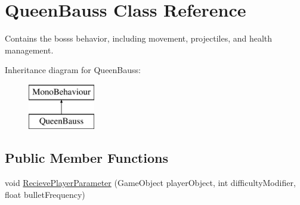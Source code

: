 \hypertarget{class_queen_bauss}{}\section{Queen\+Bauss Class Reference}
\label{class_queen_bauss}


Contains the boss\textquotesingle{}s behavior, including movement, projectiles, and health management.  


Inheritance diagram for Queen\+Bauss\+:\begin{figure}[H]
\begin{center}
\leavevmode
\includegraphics[height=2.000000cm]{class_queen_bauss}
\end{center}
\end{figure}
\subsection*{Public Member Functions}
\begin{DoxyCompactItemize}
\item 
void \mbox{\hyperlink{class_queen_bauss_a40fa065ef12d2fa9e9483c271d3e75a6}{Recieve\+Player\+Parameter}} (Game\+Object player\+Object, int difficulty\+Modifier, float bullet\+Frequency)
\end{DoxyCompactItemize}
